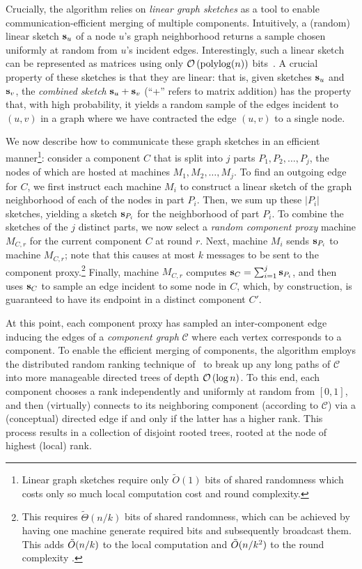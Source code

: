 Crucially, the algorithm relies on \emph{linear graph sketches} as a tool to enable communication-efficient
merging of multiple components. Intuitively, a (random) linear sketch $\mathbf{s}_u$ of a node $u$'s
graph neighborhood returns a sample chosen uniformly at random from $u$'s incident edges.
Interestingly, such a linear sketch can be represented as matrices using only $\mathcal{O}\left(\operatorname{polylog}(n)\right)$
bits~\cite{JowhariST11,McGregor14}. A crucial property of these sketches is that they are linear:
that is, given sketches $\mathbf{s}_u$ and $\mathbf{s}_v$, the \emph{combined sketch} $\mathbf{s}_u + \mathbf{s}_v$
(``+'' refers to matrix addition) has the property that, with high probability, it yields a random sample of the edges incident to
$(u,v)$ in a graph where we have contracted the edge $(u,v)$ to a single node. 

We now describe how to communicate these graph sketches in an efficient manner\footnote{Linear graph sketches require only $\tilde{O}(1)$ bits of shared randomness which costs
only so much local computation cost and round complexity\cite{topc18}.}:
consider a component $C$ that is split into $j$ parts $P_1,P_2,\dots,P_j$, the nodes of which
are hosted at machines $M_1,M_2,\dots,M_j$. To find an outgoing edge for $C$, we first instruct each
machine $M_i$ to construct a linear sketch of the graph neighborhood of each of the nodes in part $P_i$.
Then, we sum up these $|P_i|$ sketches, yielding a sketch $\mathbf{s}_{P_i}$ for the neighborhood of part $P_i$. 
To combine the sketches of the $j$ distinct parts, we now select a \emph{random component proxy}
machine $M_{C,r}$ for the current component $C$ at round $r$.
Next, machine $M_i$ sends $\mathbf{s}_{P_i}$ to machine $M_{C,r}$; note that this causes at most $k$ messages
to be sent to the component proxy.\footnote{This requires $\tilde{\Theta}(n/k)$ bits of shared randomness, which can be achieved by having  one machine  generate required bits and subsequently broadcast them. This adds $\Tilde{O}(n/k)$ to the local computation and $\Tilde{O}(n/k^2)$ to the round complexity \cite{topc18}.} Finally, machine $M_{C,r}$ computes $\mathbf{s}_C = \sum_{i=1}^j \mathbf{s}_{P_i}$,
and then uses $\mathbf{s}_C$ to sample an edge incident to some node in $C$, which, by construction, is guaranteed
to have its endpoint in a distinct component $C'$. 

At this point, each component proxy has sampled an inter-component edge
inducing the edges of a \emph{component graph} $\mathcal{C}$ where each vertex corresponds to a component.
To enable the efficient merging of components, the algorithm employs the distributed random ranking technique of~\cite{ChenP12}
to break up any long paths of $\mathcal{C}$ into more manageable directed trees of depth $\mathcal{O}\left(\log n\right)$.
To this end, each component chooses a rank independently
and uniformly at random from $[0,1]$, and then (virtually) connects to its neighboring
component (according to $\mathcal{C}$) via a (conceptual) directed edge if and only if the latter has a higher rank. 
This process results in a collection of disjoint rooted trees, rooted at the node of highest (local) rank.

